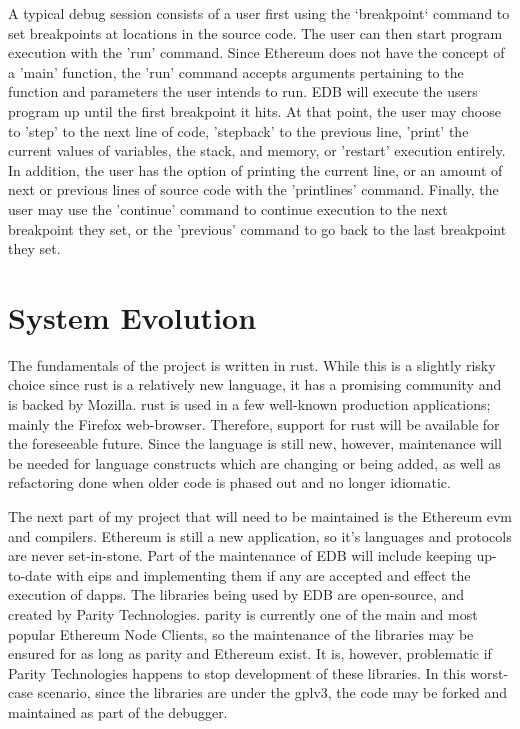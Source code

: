 \documentclass{report}
\begin{document}
A typical debug session consists of a user first using the `breakpoint` command to set breakpoints at locations in the source code. The user can then start program execution with the 'run' command. Since Ethereum does not have the concept of a 'main' function, the 'run' command accepts arguments pertaining to the function and parameters the user intends to run. EDB will execute the users program up until the first breakpoint it hits. At that point, the user may choose to 'step' to the next line of code, 'stepback' to the previous line, 'print' the current values of variables, the stack, and memory, or 'restart' execution entirely. In addition, the user has the option of printing the current line, or an amount of next or previous lines of source code with the 'printlines' command. Finally, the user may use the 'continue' command to continue execution to the next breakpoint they set, or the 'previous' command to go back to the last breakpoint they set.

\section{System Evolution}

The fundamentals of the project is written in \Gls{rust}. While this is a slightly risky choice since \Gls{rust} is a relatively new language, it has a promising community and is backed by Mozilla. \Gls{rust} is used in a few well-known production applications; mainly the Firefox web-browser. Therefore, support for \Gls{rust} will be available for the foreseeable future. Since the language is still new, however, maintenance will be needed for language constructs which are changing or being added, as well as refactoring done when older code is phased out and no longer idiomatic.

The next part of my project that will need to be maintained is the Ethereum \gls{evm} and compilers. Ethereum is still a new application, so it's languages and protocols are never set-in-stone. Part of the maintenance of EDB will include keeping up-to-date with \glspl{eip} and implementing them if any are accepted and effect the execution of \glspl{dapp}. The libraries being used by EDB are open-source, and created by Parity Technologies. \Gls{parity} is currently one of the main and most popular Ethereum Node Clients, so the maintenance of the libraries may be ensured for as long as \Gls{parity} and Ethereum exist. It is, however, problematic if Parity Technologies happens to stop development of these libraries. In this worst-case scenario, since the libraries are under the \gls{gplv3}, the code may be forked and maintained as part of the debugger.

\printglossary[title={Glossary | Index}]
\end{document}
